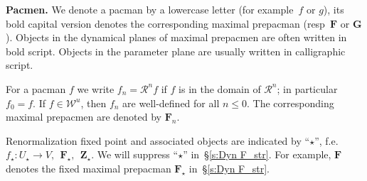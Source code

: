 \documentclass{amsart}
\renewcommand{\sp}{{\ \ }}
\newcommand{\1}{{\mathbb 1 }}
\newcommand\RR{\mathcal{R}}
\newcommand{\bF}{{\mathbf F}}
\newcommand{\bZ}{{\mathbf Z}}
\newcommand{\bG}{{\mathbf G}}
\newcommand{\str}{{\star}}
\newcommand\WW{\mathcal{W}}
\theoremstyle{remark}
\numberwithin{equation}{section}
\theoremstyle{definition}
\theoremstyle{nonumberbreak}
\begin{document}
{\bf Pacmen.} We denote a pacman by a lowercase letter (for example~$f$ or $g$), its bold capital version denotes the corresponding maximal prepacman (resp~$\bF$ or $\bG$). Objects in the dynamical planes of maximal prepacmen are often written in bold script. Objects in the parameter plane are usually written in calligraphic script. 


For a pacman $f$ we write $f_n=\RR^n f$ if $f$ is in the domain of $\RR^n$; in particular $f_0=f$. If $f\in \WW^u$, then $f_n$ are well-defined for all $n\le 0$. The corresponding maximal prepacmen are denoted by $\bF_n$. 







Renormalization fixed point and associated objects are indicated by ``$\str$'', f.e. $f_\str \colon  U_\str\to V, \sp \bF_\str,\sp \bZ_\str$.  We will suppress ``$\str$'' in~\S\ref{s:Dyn F_str}. For example, $\bF$ denotes the fixed maximal prepacman $\bF_\str$ in~\S\ref{s:Dyn F_str}.
\end{document}
